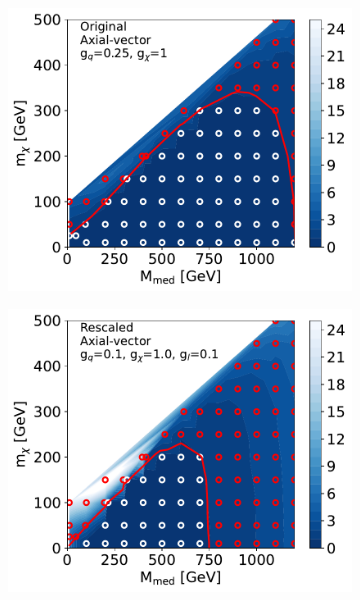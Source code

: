 \documentclass[a4paper, 11pt]{article}
\begin{document}
\begin{figure}[htp!]
  \begin{center}
  \begin{subfigure}[b]{0.49\textwidth}  
    \includegraphics[width=\textwidth]{figures/monox/EXOT-2016-32_AV_gq0p25_gchi1p0_original_withcontour.pdf}
    \caption{}
    \label{subfig:monophoton_A1}
  \end{subfigure}
  \begin{subfigure}[b]{0.49\textwidth}  
    \includegraphics[width=\textwidth]{figures/monox/EXOT-2016-32_AV_gq0p1_gl0p1_gchi1p0_compare.pdf}
    \caption{}
    \label{subfig:monophoton_A2}  
  \end{subfigure}
  

\end{center}
\end{figure}
\end{document}
